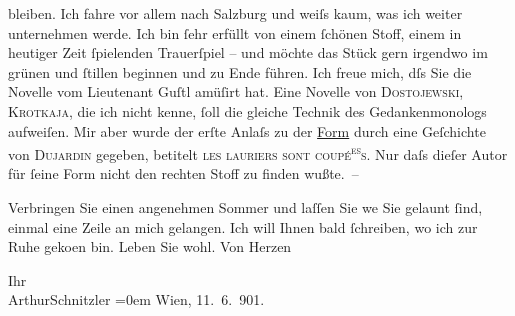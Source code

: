                bleiben. Ich fahre vor allem nach Salzburg und
               weiſs kaum, was ich weiter unternehmen werde. Ich bin ſehr erfüllt von einem ſchönen
               Stoff, einem in heutiger Zeit ſpielenden {\pb}Trauerſpiel – und möchte das
               Stück gern irgendwo im grünen und ſtillen beginnen und zu Ende führen. Ich freue
               mich, dſs Sie die Novelle vom Lieutenant Guſtl
               amüſirt hat. Eine Novelle von \textsc{Dostojewski}, \textsc{Krotkaja}, die ich nicht kenne, ſoll die gleiche Technik des Gedankenmonologs aufweiſen.
               Mir aber wurde der erſte Anlaſs zu der \uline{Form} durch
               eine Geſchichte {\pb}von \textsc{Dujardin} gegeben, betitelt \textsc{les lauriers sont coupé}\substVorne{}\textsuperscript{\textsc{es}}\substDazwischen{}\textsc{s}\substHinten{}. Nur daſs dieſer Autor für ſeine Form nicht den rechten Stoff zu finden
               wußte. –\pend
           
\pstart
           Verbringen Sie einen angenehmen Sommer und laſſen Sie we{\geminationn}{ }Sie gelaunt ſind, einmal eine Zeile an mich
               gelangen. Ich will Ihnen bald ſchreiben, wo ich zur Ruhe geko{\geminationm}en {\pb}bin. Leben Sie
               wohl. Von Herzen\pend
           
\pstart
           Ihr{\\[\baselineskip]}\spacefill\mbox{ArthurSchnitzler}\pend
           \leftskip=0em{}
\pstart
           Wien, 11. 6. 901.\pend
           \endnumbering{}  
      